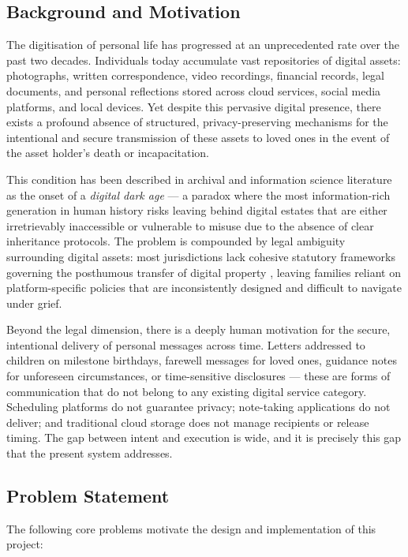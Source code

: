 \documentclass[12pt, a4paper]{article}
\begin{document}
\subsection{Background and Motivation}

The digitisation of personal life has progressed at an unprecedented rate over the past two decades. Individuals today accumulate vast repositories of digital assets: photographs, written correspondence, video recordings, financial records, legal documents, and personal reflections stored across cloud services, social media platforms, and local devices. Yet despite this pervasive digital presence, there exists a profound absence of structured, privacy-preserving mechanisms for the intentional and secure transmission of these assets to loved ones in the event of the asset holder's death or incapacitation.

This condition has been described in archival and information science literature as the onset of a \textit{digital dark age} \cite{dinneen2024} — a paradox where the most information-rich generation in human history risks leaving behind digital estates that are either irretrievably inaccessible or vulnerable to misuse due to the absence of clear inheritance protocols. The problem is compounded by legal ambiguity surrounding digital assets: most jurisdictions lack cohesive statutory frameworks governing the posthumous transfer of digital property \cite{mali2021}, leaving families reliant on platform-specific policies that are inconsistently designed and difficult to navigate under grief.

Beyond the legal dimension, there is a deeply human motivation for the secure, intentional delivery of personal messages across time. Letters addressed to children on milestone birthdays, farewell messages for loved ones, guidance notes for unforeseen circumstances, or time-sensitive disclosures — these are forms of communication that do not belong to any existing digital service category. Scheduling platforms do not guarantee privacy; note-taking applications do not deliver; and traditional cloud storage does not manage recipients or release timing. The gap between intent and execution is wide, and it is precisely this gap that the present system addresses.

\subsection{Problem Statement}

The following core problems motivate the design and implementation of this project:
\end{document}
